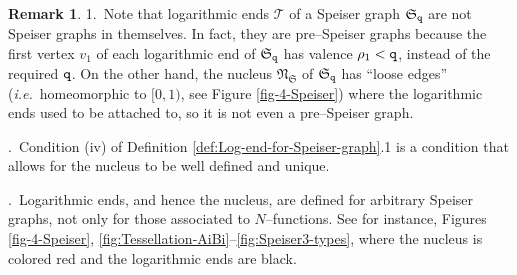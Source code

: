 \documentclass[final,3p,times]{elsarticle}
\theoremstyle{definition}
\newtheorem{remark}[theorem]{Remark}
\begin{document}
\begin{remark}
\label{rem:On-logarithmic-ends}
1.\
Note that logarithmic ends $\mathcal{T}$ of a 
Speiser graph $\mathfrak{S}_{\tt q}$ are not Speiser graphs in themselves.
In fact, they are pre--Speiser graphs
because
the first vertex $v_1$ of each logarithmic end 
of $\mathfrak{S}_{\tt q}$
has valence $\rho_1<{\tt q}$, instead of the required ${\tt q}$.
On the other hand, the nucleus $\mathfrak{N}_\mathfrak{S}$ of 
$\mathfrak{S}_{\tt q}$ has ``loose edges'' 
(\emph{i.e.}\ homeomorphic to $[0,1)$, see Figure \ref{fig-4-Speiser})
where the logarithmic ends used to be attached to, so it is not even a pre--Speiser graph.

.\
Condition (iv) of Definition \ref{def:Log-end-for-Speiser-graph}.1 is a condition
that allows for the nucleus to be well defined 
and unique. 

.\
Logarithmic ends, and hence the nucleus, are defined for arbitrary Speiser graphs, not only
for those associated to $N$--functions.
See for instance, Figures \ref{fig-4-Speiser}, \ref{fig:Tessellation-AiBi}--\ref{fig:Speiser3-types},
where the nucleus is colored red and the logarithmic ends are black.
\end{remark}
\end{document}
